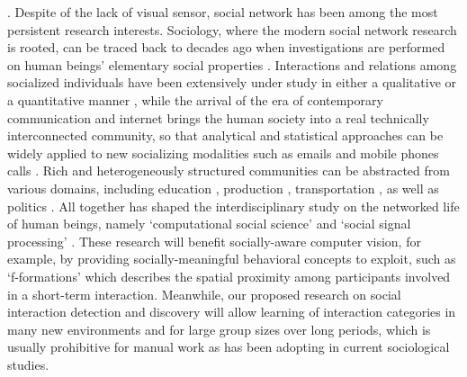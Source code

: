 .  Despite of the lack of visual sensor, social network has been among the most persistent research interests. Sociology, where the modern social network research is rooted, can be traced back to decades ago when investigations are performed on human beings' elementary social properties \cite{Darwin,Thomkins,Goffman,Kendon1990,Ekman,Hoyle,Tannen}. Interactions and relations among socialized individuals have been extensively under study in either a qualitative or a quantitative manner \cite{Goodwin2000,Goldin,Goodwin2007,Kendon2010}, while the arrival of the era of contemporary communication and internet brings the human society into a real technically interconnected community, so that analytical and statistical approaches can be widely applied to new socializing modalities such as emails \cite{Eckmann} and mobile phones calls \cite{Onnela,Eagle}. Rich and heterogeneously structured communities can be abstracted from various domains, including education \cite{Scherr2009}, production \cite{Watts}, transportation \cite{Gonzalez},  as well as politics \cite{Iacus}. All together has shaped the interdisciplinary study on the networked life of human beings, namely `computational social science' \cite{Lazer2009} and `social signal processing' \cite{Pantic}. These research will benefit socially-aware computer vision, for example, by providing socially-meaningful behavioral concepts to exploit, such as `f-formations' \cite{Kendon1990} which describes the spatial proximity among participants involved in a short-term interaction. Meanwhile, our proposed research on social interaction detection and discovery will allow learning of interaction categories in many new environments and for large group sizes over long periods, which is usually prohibitive for manual work as has been adopting in current sociological studies.



